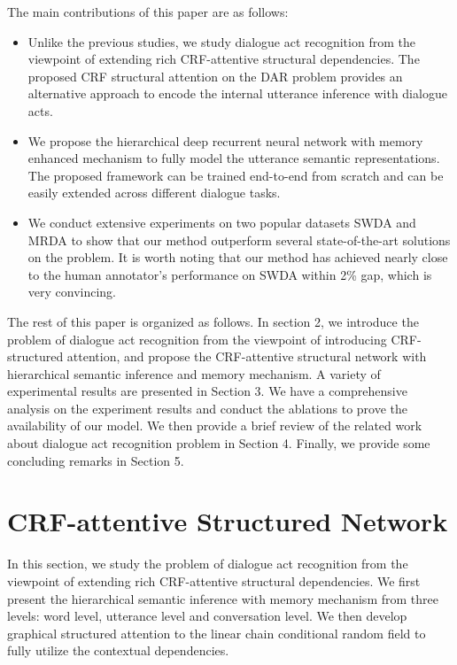 \documentclass[sigconf]{acmart}
\begin{document}
The main contributions of this paper are as follows:
\begin{itemize}
\item Unlike the previous studies, we study dialogue act recognition from the viewpoint of extending rich CRF-attentive structural dependencies. The proposed CRF structural attention on the DAR problem provides an alternative approach to encode the internal utterance inference with dialogue acts.

\item We propose the hierarchical deep recurrent neural network with memory enhanced mechanism to fully model the utterance semantic representations. The proposed framework can be trained end-to-end from scratch and can be easily extended across different dialogue tasks. 

\item We conduct extensive experiments on two popular datasets SWDA and MRDA to show that our method outperform several state-of-the-art solutions on the problem. It is worth noting that our method has achieved nearly close to the human annotator's performance on SWDA within 2\% gap, which is very convincing.
\end{itemize}

The rest of this paper is organized as follows. In section 2, we introduce the problem of dialogue act recognition from the viewpoint of introducing CRF-structured attention, and propose the CRF-attentive structural network with hierarchical semantic inference and memory mechanism. A variety of experimental results are presented in Section 3. We have a comprehensive analysis on the experiment results and conduct the ablations to prove the availability of our model. We then provide a brief review of the related work about dialogue act recognition problem in Section 4. Finally, we provide some concluding remarks in Section 5.  

\section{CRF-attentive Structured Network  }
In this section, we study the problem of dialogue act recognition from the viewpoint of extending rich CRF-attentive structural dependencies. We first present the hierarchical semantic inference with memory mechanism from three levels: word level, utterance level and conversation level. We then develop graphical structured attention to the linear chain conditional random field to fully utilize the contextual dependencies.
\end{document}
